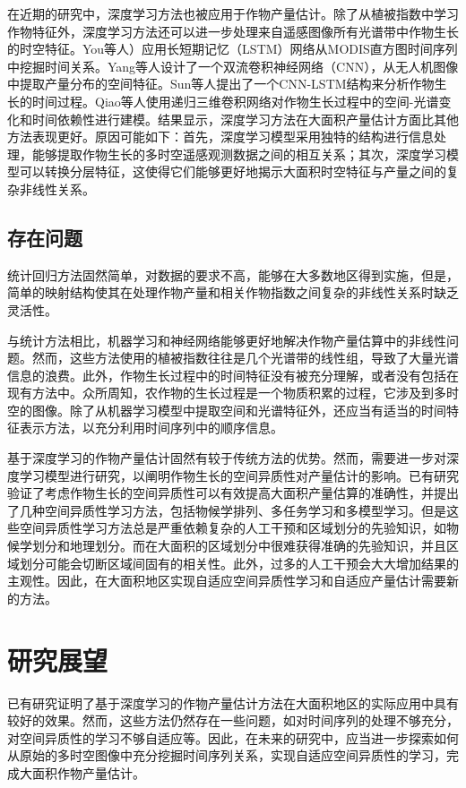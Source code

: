 \par 在近期的研究中，深度学习方法也被应用于作物产量估计。除了从植被指数中学习作物特征外，深度学习方法还可以进一步处理来自遥感图像所有光谱带中作物生长的时空特征。You等人）应用长短期记忆（LSTM）网络从MODIS直方图时间序列中挖掘时间关系\cite{you2017deep}。Yang等人设计了一个双流卷积神经网络（CNN），从无人机图像中提取产量分布的空间特征\cite{yang2019deep}。Sun等人提出了一个CNN-LSTM结构来分析作物生长的时间过程\cite{sun2019county}。Qiao等人使用递归三维卷积网络对作物生长过程中的空间-光谱变化和时间依赖性进行建模\cite{qiao2021crop}。结果显示，深度学习方法在大面积产量估计方面比其他方法表现更好。原因可能如下：首先，深度学习模型采用独特的结构进行信息处理，能够提取作物生长的多时空遥感观测数据之间的相互关系\cite{werbos1990backpropagation}；其次，深度学习模型可以转换分层特征，这使得它们能够更好地揭示大面积时空特征与产量之间的复杂非线性关系\cite{lecun2015deep}。

\subsection{存在问题}

\par 统计回归方法固然简单，对数据的要求不高，能够在大多数地区得到实施，但是，简单的映射结构使其在处理作物产量和相关作物指数之间复杂的非线性关系时缺乏灵活性\cite{balaghi2008empirical, ren2008regional}。

\par 与统计方法相比，机器学习和神经网络能够更好地解决作物产量估算中的非线性问题。然而，这些方法使用的植被指数往往是几个光谱带的线性组，导致了大量光谱信息的浪费。此外，作物生长过程中的时间特征没有被充分理解，或者没有包括在现有方法中。众所周知，农作物的生长过程是一个物质积累的过程，它涉及到多时空的图像。除了从机器学习模型中提取空间和光谱特征外，还应当有适当的时间特征表示方法，以充分利用时间序列中的顺序信息。

\par 基于深度学习的作物产量估计固然有较于传统方法的优势。然而，需要进一步对深度学习模型进行研究，以阐明作物生长的空间异质性对产量估计的影响。已有研究验证了考虑作物生长的空间异质性可以有效提高大面积产量估算的准确性\cite{challinor2004design, chen2018improving, duncan2015potential, tao2009modelling}，并提出了几种空间异质性学习方法，包括物候学排列、多任务学习和多模型学习。但是这些空间异质性学习方法总是严重依赖复杂的人工干预和区域划分的先验知识，如物候学划分和地理划分。而在大面积的区域划分中很难获得准确的先验知识，并且区域划分可能会切断区域间固有的相关性。此外，过多的人工干预会大大增加结果的主观性。因此，在大面积地区实现自适应空间异质性学习和自适应产量估计需要新的方法。

\section{研究展望}

\par 已有研究证明了基于深度学习的作物产量估计方法在大面积地区的实际应用中具有较好的效果。然而，这些方法仍然存在一些问题，如对时间序列的处理不够充分，对空间异质性的学习不够自适应等。因此，在未来的研究中，应当进一步探索如何从原始的多时空图像中充分挖掘时间序列关系，实现自适应空间异质性的学习，完成大面积作物产量估计。

\newpage
\begingroup
    \printbibliography[title={参考文献}]
\endgroup
